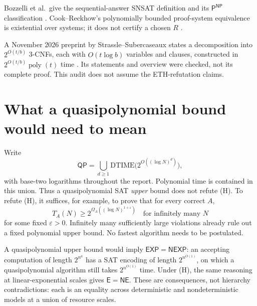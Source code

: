 \documentclass[11pt]{article}
\newcommand{\Pclass}{\mathsf P}
\newcommand{\NP}{\mathsf{NP}}
\newcommand{\QP}{\mathsf{QP}}
\newcommand{\poly}{\operatorname{poly}}
\begin{document}
Bozzelli et al.\ give the sequential-answer SNSAT definition and its
$\Pclass^{\NP}$ classification \cite{bozzelli2016}. Cook--Reckhow's
polynomially bounded proof-system equivalence is existential over systems;
it does not certify a chosen $R$ \cite{cookreckhow1979}.

A November 2026 preprint by Strassle--Subercaseaux states a decomposition
into $2^{O(t/b)}$ 3-CNFs, each with $O(t\log b)$ variables and clauses,
constructed in $2^{O(t/b)}\poly(t)$ time
\cite[Lemma 2.1 and Corollary 2.2]{strassle2026}.
Its statements and overview were checked, not its complete proof.
This audit does not assume the ETH-refutation claims.

\section{What a quasipolynomial bound would need to mean}
Write
\[
 \QP=\bigcup_{d\ge1}\mathrm{DTIME}\bigl(2^{O((\log N)^d)}\bigr),
\]
with base-two logarithms throughout the report. Polynomial time is contained
in this union. Thus a quasipolynomial SAT \emph{upper} bound does not refute
(H). To refute (H), it suffices, for example, to prove that for every correct
$A$,
\[
 T_A(N)\ge 2^{\Omega_A((\log N)^{1+\varepsilon})}
 \quad\text{for infinitely many }N
 \tag{1}
\]
for some fixed $\varepsilon>0$. Infinitely many sufficiently large violations
already rule out a fixed polynomial upper bound. No fastest algorithm needs
to be postulated.

A quasipolynomial upper bound would imply $\mathsf{EXP}=\mathsf{NEXP}$:
an accepting computation of length $2^{n^a}$ has a SAT encoding of length
$2^{n^{O(1)}}$, on which a quasipolynomial algorithm still takes
$2^{n^{O(1)}}$ time. Under (H), the same reasoning at linear-exponential
scales gives $\mathsf E=\mathsf{NE}$. These are consequences, not hierarchy
contradictions: each is an equality across deterministic and nondeterministic
models at a union of resource scales.
\end{document}

